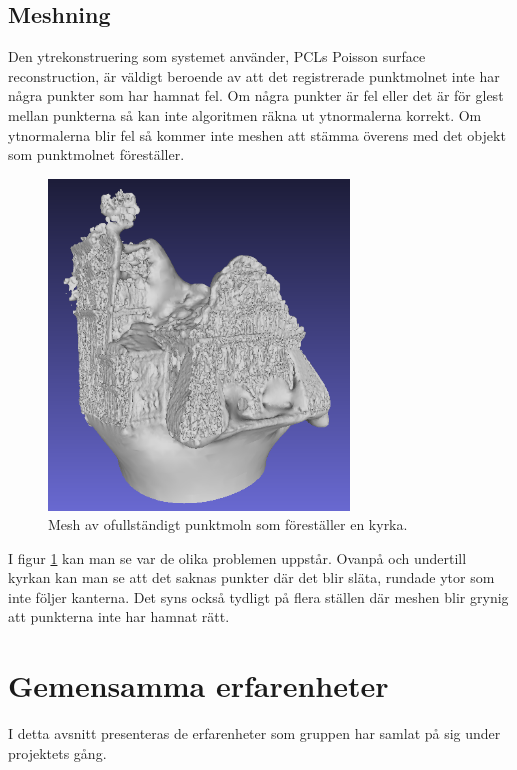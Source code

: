 \subsection{Meshning}

Den ytrekonstruering som systemet använder, PCLs Poisson surface reconstruction, är väldigt beroende av att det registrerade punktmolnet inte har några punkter som har hamnat fel. Om några punkter är fel eller det är för glest mellan punkterna så kan inte algoritmen räkna ut ytnormalerna korrekt. Om ytnormalerna blir fel så kommer inte meshen att stämma överens med det objekt som punktmolnet föreställer.

\begin{figure}[H]
	\centering
	\includegraphics[width=80mm]{figures/3DCopyMeshChurch.PNG}
	\caption{Mesh av ofullständigt punktmoln som föreställer en kyrka.}
	\label{fig:3dcopy_mesh_church}
\end{figure}

I figur \ref{fig:3dcopy_mesh_church} kan man se var de olika problemen uppstår. Ovanpå och undertill kyrkan kan man se att det saknas punkter där det blir släta, rundade ytor som inte följer kanterna. Det syns också tydligt på flera ställen där meshen blir grynig att punkterna inte har hamnat rätt.

\section{Gemensamma erfarenheter}

I detta avsnitt presenteras de erfarenheter som gruppen har samlat på sig under projektets gång.


